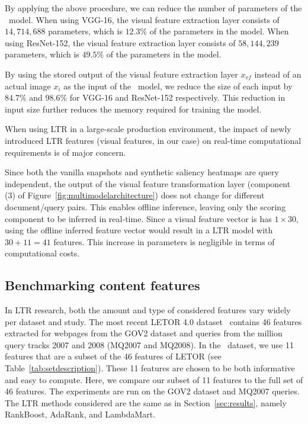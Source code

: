 By applying the above procedure, we can reduce the number of parameters of the \modelname~model.
When using VGG-16, the visual feature extraction layer consists of $14,714,688$ parameters, which is $12.3\%$ of the parameters in the \modelname{} model.
When using ResNet-152, the visual feature extraction layer consists of $58,144,239$ parameters, which is $49.5\%$ of the parameters in the \modelname{} model.

By using the stored output of the visual feature extraction layer $x_{vf}$ instead of an actual image $x_{i}$ as the input of the \modelname~model,
we reduce the size of each input by $84.7\%$ and $98.6\%$ for VGG-16 and ResNet-152 respectively.
This reduction in input size further reduces the memory required for training the model.


When using \ac{LTR} in a large-scale production environment, the impact of newly introduced \ac{LTR} features (visual features, in our case) on real-time computational requirements is of major concern.

Since both the vanilla snapshots and synthetic saliency heat\-maps are query independent, the output of the visual feature transformation layer (component (3) of Figure~\ref{fig:multimodelarchitecture}) does not change for different document/query pairs. This enables offline inference, leaving only the scoring component to be inferred in real-time.
Since a visual feature vector is has $1\times30$, using the offline inferred feature vector would result in a \ac{LTR} model with $30 + 11 = 41$ features. This increase in parameters is negligible in terms of computational costs.


\subsection{Benchmarking content features} \label{sec:contentfeatures}
In \ac{LTR} research, both the amount and type of considered features vary widely per dataset and study.
The most recent LETOR 4.0 dataset~\cite{Qin2013:Introducing} contains 46 features extracted for webpages from the GOV2 dataset and queries from the million query tracks 2007 and 2008 (MQ2007 and MQ2008).
In the \datasetname~dataset, we use 11 features that are a subset of the 46 features of LETOR (see Table~\ref{tab:setdescription}).
These 11 features are chosen to be both informative and easy to compute.
Here, we compare our subset of 11 features to the full set of 46 features.
The experiments are run on the GOV2 dataset and MQ2007 queries.
The \ac{LTR} methods considered are the same as in Section~\ref{sec:results}, namely RankBoost, AdaRank, and LambdaMart.

